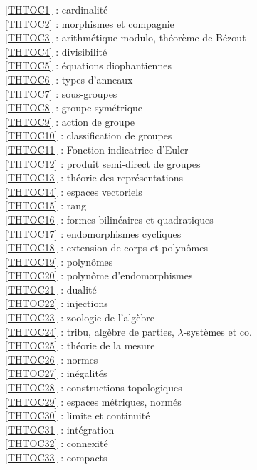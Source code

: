 \ref {THTOC1} : cardinalité\\
\ref {THTOC2} : morphismes et compagnie\\
\ref {THTOC3} : arithmétique modulo, théorème de Bézout\\
\ref {THTOC4} : divisibilité\\
\ref {THTOC5} : équations diophantiennes\\
\ref {THTOC6} : types d'anneaux\\
\ref {THTOC7} : sous-groupes\\
\ref {THTOC8} : groupe symétrique\\
\ref {THTOC9} : action de groupe\\
\ref {THTOC10} : classification de groupes\\
\ref {THTOC11} : Fonction indicatrice d'Euler\\
\ref {THTOC12} : produit semi-direct de groupes\\
\ref {THTOC13} : théorie des représentations\\
\ref {THTOC14} : espaces vectoriels\\
\ref {THTOC15} : rang\\
\ref {THTOC16} : formes bilinéaires et quadratiques\\
\ref {THTOC17} : endomorphismes cycliques\\
\ref {THTOC18} : extension de corps et polynômes\\
\ref {THTOC19} : polynômes\\
\ref {THTOC20} : polynôme d'endomorphismes\\
\ref {THTOC21} : dualité\\
\ref {THTOC22} : injections\\
\ref {THTOC23} : zoologie de l'algèbre\\
\ref {THTOC24} : tribu, algèbre de parties, \( \lambda \)-systèmes et co.\\
\ref {THTOC25} : théorie de la mesure\\
\ref {THTOC26} : normes\\
\ref {THTOC27} : inégalités\\
\ref {THTOC28} : constructions topologiques\\
\ref {THTOC29} : espaces métriques, normés\\
\ref {THTOC30} : limite et continuité\\
\ref {THTOC31} : intégration\\
\ref {THTOC32} : connexité\\
\ref {THTOC33} : compacts\\
